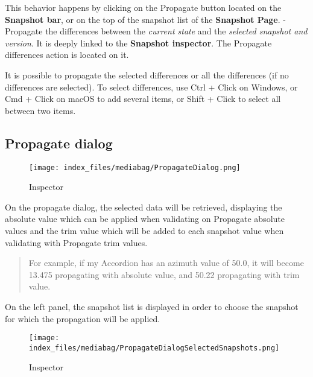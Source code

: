 \documentclass[
  letterpaper,
  DIV=11,
  numbers=noendperiod]{scrreport}
\begin{document}
This behavior happens by clicking on the Propagate button located on the
\textbf{Snapshot bar}, or on the top of the snapshot list of the
\textbf{Snapshot Page}. - Propagate the differences between the
\emph{current state} and the \emph{selected snapshot and version}. It is
deeply linked to the \textbf{Snapshot inspector}. The Propagate
differences action is located on it.

It is possible to propagate the selected differences or all the
differences (if no differences are selected). To select differences, use
Ctrl + Click on Windows, or Cmd + Click on macOS to add several items,
or Shift + Click to select all between two items.

\hypertarget{propagate-dialog}{%
\subsection{Propagate dialog}\label{propagate-dialog}}

\begin{figure}

{\centering \texttt{[image: index\_files/mediabag/PropagateDialog.png]}

}

\caption{Inspector}

\end{figure}

On the propagate dialog, the selected data will be retrieved, displaying
the absolute value which can be applied when validating on Propagate
absolute values and the trim value which will be added to each snapshot
value when validating with Propagate trim values.

\begin{quote}
For example, if my Accordion has an azimuth value of 50.0, it will
become 13.475 propagating with absolute value, and 50.22 propagating
with trim value.
\end{quote}

On the left panel, the snapshot list is displayed in order to choose the
snapshot for which the propagation will be applied.

\begin{figure}

{\centering \texttt{[image: index\_files/mediabag/PropagateDialogSelectedSnapshots.png]}

}

\caption{Inspector}

\end{figure}
\end{document}
